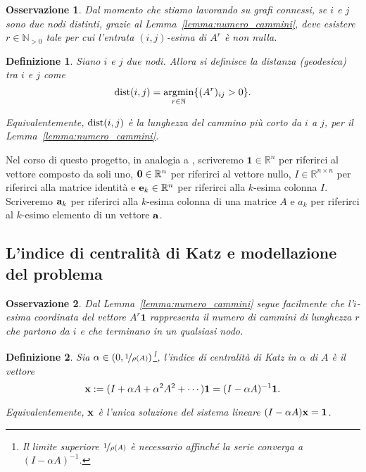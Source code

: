 \documentclass[a4paper]{article}
\newcommand{\dist}{{\rm dist}}
\newcommand{\NN}{\mathbb{N}}
\newcommand{\NNp}{\mathbb{N}_{> 0}}
\newcommand{\RR}{\mathbb{R}}
\DeclareMathOperator*{\argmin}{\arg\!\min}
\newcommand{\evec}{{\bf e}}
\newcommand{\avec}{{\bf a}}
\newcommand{\xvec}{{\bf x}}
\newcommand{\bone}{\mathbf{1}}
\newcommand{\bzero}{{\bf 0}}
\newcommand{\inv}{^{-1}}
\newtheorem{definition}{Definizione}
\newtheorem{remark}{Osservazione}
\begin{document}
\begin{remark}
	Dal momento che stiamo lavorando su grafi connessi, se $i$ e $j$ sono
	due nodi distinti, grazie al Lemma~\ref{lemma:numero_cammini}, deve
	esistere $r \in \NNp$ tale per cui l'entrata $(i,j)$-esima di $A^r$
	è non nulla.
	
\end{remark}

\begin{definition} \label{def:distanza} Siano $i$ e $j$
	due nodi. Allora si definisce la {\rm distanza (geodesica) tra $i$ e $j$} come
	\begin{equation}
		\dist(i, j) = \argmin_{r \in \NN} \{(A^r)_{ij} > 0\}.
	\end{equation}
	
	Equivalentemente, $\dist(i, j)$ è la lunghezza del cammino più corto
	da $i$ a $j$, per il Lemma~\ref{lemma:numero_cammini}.
\end{definition}

Nel corso di questo progetto, in analogia a \cite{katz2024}, scriveremo
$\bone \in \RR^n$ per riferirci al vettore composto da soli uno, $\bzero \in \RR^n$ per riferirci al vettore nullo, $I \in \RR^{n \times n}$ per riferirci
alla matrice identità e $\evec_k \in \RR^n$ per riferirci alla $k$-esima colonna $I$. Scriveremo $\avec_k$ per riferirci alla $k$-esima colonna di una matrice $A$ e $a_k$ per riferirci al $k$-esimo elemento di un vettore $\avec$.

\subsection{L'indice di centralità di Katz e modellazione del problema}

\begin{remark}
	\label{remark:molt_per_1}
	Dal Lemma~\ref{lemma:numero_cammini} segue facilmente che l'$i$-esima
	coordinata del vettore $A^r \bone$ rappresenta il numero di cammini
	di lunghezza $r$ che partono da $i$ e che terminano in un qualsiasi nodo.
\end{remark}

\begin{definition} Sia $\alpha \in (0, \nicefrac{1}{\rho(A)})$\footnote{Il limite superiore $\nicefrac{1}{\rho(A)}$ è necessario affinché la serie converga a $(I-\alpha A)\inv$.}, {\rm l'indice di centralità di Katz in $\alpha$ di $A$} è il vettore
	\[
		\xvec := (I + \alpha A + \alpha^2A^2+\cdots) \bone = (I-\alpha A)\inv \bone.
	\]
	
	Equivalentemente, $\xvec$ è l'unica soluzione del sistema lineare $(I-\alpha A)\xvec = \bone$.
\end{definition}
    
\end{document}
